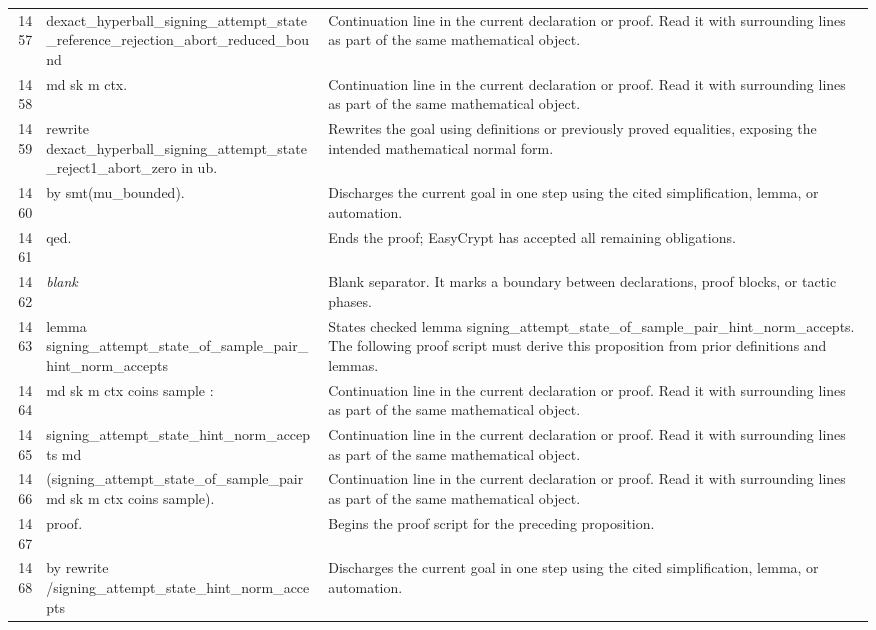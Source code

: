 \documentclass[10pt]{article}
\begin{document}
\begin{longtable}{r L{0.53\textwidth} L{0.37\textwidth}}
1457 & {\ttfamily\scriptsize   dexact\_hyperball\_signing\_attempt\_state\_reference\_rejection\_abort\_reduced\_bound} & Continuation line in the current declaration or proof.  Read it with surrounding lines as part of the same mathematical object. \\
1458 & {\ttfamily\scriptsize     md sk m ctx.} & Continuation line in the current declaration or proof.  Read it with surrounding lines as part of the same mathematical object. \\
1459 & {\ttfamily\scriptsize rewrite dexact\_hyperball\_signing\_attempt\_state\_reject1\_abort\_zero in ub.} & Rewrites the goal using definitions or previously proved equalities, exposing the intended mathematical normal form. \\
1460 & {\ttfamily\scriptsize by smt(mu\_bounded).} & Discharges the current goal in one step using the cited simplification, lemma, or automation. \\
1461 & {\ttfamily\scriptsize qed.} & Ends the proof; EasyCrypt has accepted all remaining obligations. \\
1462 & {\ttfamily\scriptsize \emph{blank}} & Blank separator.  It marks a boundary between declarations, proof blocks, or tactic phases. \\
1463 & {\ttfamily\scriptsize lemma signing\_attempt\_state\_of\_sample\_pair\_hint\_norm\_accepts} & States checked lemma signing\_attempt\_state\_of\_sample\_pair\_hint\_norm\_accepts.  The following proof script must derive this proposition from prior definitions and lemmas. \\
1464 & {\ttfamily\scriptsize    md sk m ctx coins sample :} & Continuation line in the current declaration or proof.  Read it with surrounding lines as part of the same mathematical object. \\
1465 & {\ttfamily\scriptsize   signing\_attempt\_state\_hint\_norm\_accepts md} & Continuation line in the current declaration or proof.  Read it with surrounding lines as part of the same mathematical object. \\
1466 & {\ttfamily\scriptsize     (signing\_attempt\_state\_of\_sample\_pair md sk m ctx coins sample).} & Continuation line in the current declaration or proof.  Read it with surrounding lines as part of the same mathematical object. \\
1467 & {\ttfamily\scriptsize proof.} & Begins the proof script for the preceding proposition. \\
1468 & {\ttfamily\scriptsize by rewrite /signing\_attempt\_state\_hint\_norm\_accepts} & Discharges the current goal in one step using the cited simplification, lemma, or automation. \\

\end{longtable}
\end{document}
